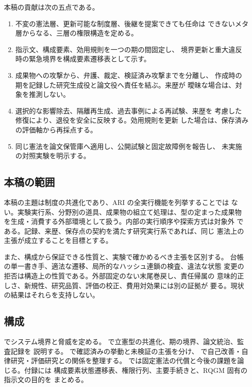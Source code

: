 本稿の貢献は次の五点である。

\begin{enumerate}
  \item 不変の憲法層、更新可能な制度層、後継を提案できても任命は
        できないメタ層からなる、三層の権限構造を定める。
  \item 指示文、構成要素、効用規則を一つの期の間固定し、
        境界更新と重大違反時の緊急境界を構成要素遷移表として示す。
  \item 成果物への攻撃から、弁護、裁定、検証済み攻撃までを分離し、
        作成時の期を記録した研究生成役と論文役へ責任を結ぶ。来歴が
        曖昧な場合は、対象を推測しない。
  \item 選択的な影響除去、隔離再生成、過去事例による再試験、来歴を
        考慮した修復により、退役を安全に反映する。効用規則を更新
        した場合は、保存済みの評価軸から再採点する。
  \item 同じ憲法を論文保管庫へ適用し、公開試験と固定故障例を報告し、
        未実施の対照実験を明示する。
\end{enumerate}

\subsection{本稿の範囲}\label{sec:intro:scope}

本稿の主題は制度の共進化であり、ARI の全実行機能を列挙することでは
ない。実験実行系、分野別の道具、成果物の組立て処理は、型の定まった成果物
を生成・消費する外部環境として扱う。内部の実行順序や探索方式は対象外
である。記録、来歴、保存点の契約を満たす研究実行系であれば、同じ
憲法上の主張が成立することを目標とする。

また、構成から保証できる性質と、実験で確かめるべき主張を区別する。
台帳の単一書き手、適法な遷移、局所的なハッシュ連鎖の検査、違法な状態
変更の拒否は構造上の性質である。外部固定のない末尾巻戻し、責任帰属の
意味的正しさ、新規性、研究品質、評価の校正、費用対効果には別の証拠が
要る。現状の結果はそれらを支持しない。

\subsection{構成}\label{sec:intro:organisation}

 でシステム境界と脅威を定める。
 で立憲型の共進化、期の境界、論文統治、監査記録を
説明する。 で確認済みの挙動と未検証の主張を分け、
 で自己改善・自律研究・評価研究との関係を整理する。
 では固定憲法の代償と今後の課題を論じる。付録には
構成要素状態遷移表、権限行列、主要手続きと、RQGM 固有の指示文の目的を
まとめる。
